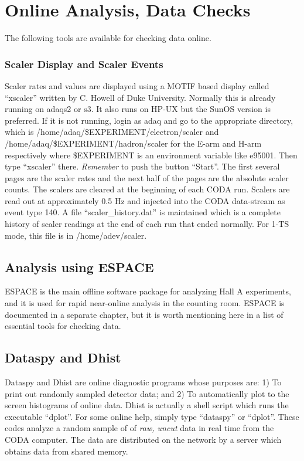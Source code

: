 \section{Online Analysis, Data Checks}
 
\par
The following tools are available for checking
data online.


\subsubsection{Scaler Display and Scaler Events}
Scaler rates and values are displayed using
a MOTIF based display called ``xscaler''
written by C. Howell of Duke University.
Normally this is already running on adaqs2 or s3.
It also runs on HP-UX but the SunOS version
is preferred.  If it is not running, login as
adaq and go to the appropriate directory,
which is 
/home/adaq/\$EXPERIMENT/electron/scaler
and
/home/adaq/\$EXPERIMENT/hadron/scaler
for the E-arm and H-arm respectively
where \$EXPERIMENT is an environment
variable like e95001.
Then type ``xscaler'' there.  
{\it Remember} to push the button ``Start''.
The first several pages are the scaler rates and
the next half of the pages are the absolute
scaler counts.  The scalers are cleared at
the beginning of each CODA run.
Scalers are read out at approximately 0.5 Hz 
and injected into the CODA data-stream 
as event type 140.  A file
``scaler\_history.dat'' is maintained which is
a complete history of scaler readings at
the end of each run that ended normally.
For 1-TS mode, this file is in /home/adev/scaler.

\subsection{Analysis using ESPACE}

ESPACE is the main offline software package
for analyzing Hall A experiments, and it is
used for rapid near-online analysis in the
counting room.  ESPACE is
documented in a separate chapter, 
but it is worth mentioning here in a list of
essential tools for checking data.

\subsection{Dataspy and Dhist} 

Dataspy and Dhist are online diagnostic programs
whose purposes are: 
\hskip 0.05in 1) To print
out randomly sampled detector data; and
\hskip 0.05in 
2) To automatically plot to the screen
histograms of online data.
\hskip 0.05in 
Dhist is actually a shell script which runs 
the executable ``dplot''.  
For some online help, simply type
``dataspy'' or ``dplot''.
These codes analyze a random sample of
of {\it raw, uncut} data
in real time from the CODA computer.
The data are distributed on the network by
a server which obtains data from shared memory.

